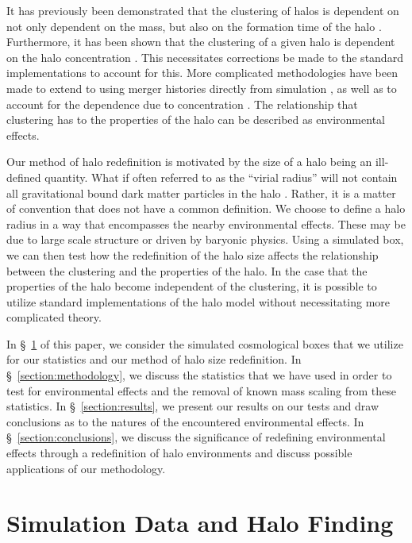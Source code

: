 \documentclass[usenatbib,usegraphicx,letterpaper]{mn2e}
\begin{document}
It has previously been demonstrated that the clustering of halos is dependent on not only dependent on the mass, but also on the formation time of the halo \citep{sheth04, gao05, croton07}. Furthermore, it has been shown that the clustering of a given halo is dependent on the halo concentration \citep{wechsler06}. This necessitates corrections be made to the standard implementations to account for this. More complicated methodologies have been made to extend to using merger histories directly from simulation \citep{dvorkin11}, as well as to account for the dependence due to concentration \citep{gil11}. The relationship that clustering has to the properties of the halo can be described as environmental effects.

Our method of halo redefinition is motivated by the size of a halo being an ill-defined quantity. What if often referred to as the ``virial radius'' will not contain all gravitational bound dark matter particles in the halo \citep{kazan06}. Rather, it is a matter of convention that does not have a common definition. We choose to define a halo radius in a way that encompasses the nearby environmental effects. These may be due to large scale structure or driven by baryonic physics. Using a simulated box, we can then test how the redefinition of the halo size affects the relationship between the clustering and the properties of the halo. In the case that the properties of the halo become independent of the clustering, it is possible to utilize standard implementations of the halo model without necessitating more complicated theory.
 
In \S~\ref{section:data} of this paper, we consider the simulated cosmological boxes that we utilize for our statistics and our method of halo size redefinition. In \S~\ref{section:methodology}, we discuss the statistics that we have used in order to test for environmental effects and the removal of known mass scaling from these statistics. In \S~\ref{section:results}, we present our results on our tests and draw conclusions as to the natures of the encountered environmental effects. In \S~\ref{section:conclusions}, we discuss the significance of redefining environmental effects through a redefinition of halo environments and discuss possible applications of our methodology.

\section[]{Simulation Data and Halo Finding}
\label{section:data}
\end{document}

